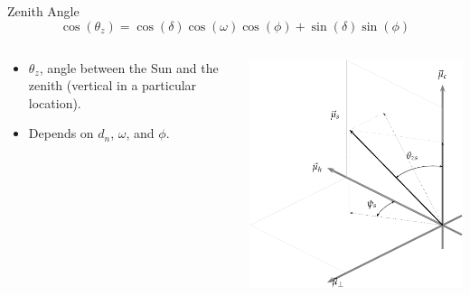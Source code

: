 \documentclass[xcolor={usenames,svgnames,dvipsnames}]{beamer}
\begin{document}
\begin{frame}[plain,label={sec:orgd087e00}]{Zenith Angle}
\[
\cos(\theta_{z}) = \cos(\delta) \cos(\omega) \cos(\phi) + \sin(\delta) \sin(\phi)
\]


\begin{columns}
\begin{column}{0.55\columnwidth}
\begin{itemize}
\item \(\theta_z\), angle between the Sun and the zenith (vertical in a particular location).
\item Depends on \(d_n\), \(\omega\), and \(\phi\).
\end{itemize}
\end{column}
\begin{column}{0.8\columnwidth}
\begin{center}
\includegraphics[width=.9\linewidth]{../figs/SistemaCoordenadasLocal-crop.pdf}
\end{center}
\end{column}
\end{columns}
\end{frame}
\end{document}
